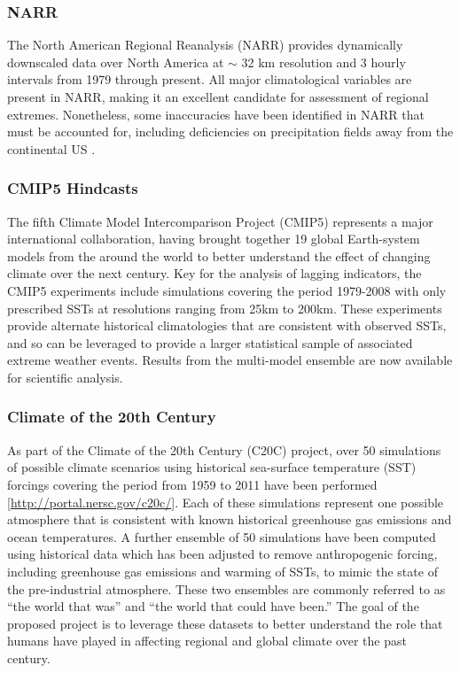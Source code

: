 \documentclass[11pt]{article}
\newcommand\citep{\cite}
\begin{document}
\subsubsection*{NARR} \label{sec:NARR}

The North American Regional Reanalysis (NARR) \citep{mesinger2006north} provides dynamically downscaled data over North America at $\sim$ 32 km resolution and 3 hourly intervals from 1979 through present.  All major climatological variables are present in NARR, making it an excellent candidate for assessment of regional extremes.  Nonetheless, some inaccuracies have been identified in NARR that must be accounted for, including deficiencies on precipitation fields away from the continental US \citep{bukovsky2007brief}.

\subsubsection*{CMIP5 Hindcasts} \label{sec:CMIP5}

The fifth Climate Model Intercomparison Project (CMIP5) represents a major international collaboration, having brought together 19 global Earth-system models from the around the world to better understand the effect of changing climate over the next century.  Key for the analysis of lagging indicators, the CMIP5 experiments include simulations covering the period 1979-2008 with only prescribed SSTs at resolutions ranging from 25km to 200km.  These experiments provide alternate historical climatologies that are consistent with observed SSTs, and so can be leveraged to provide a larger statistical sample of associated extreme weather events.  Results from the multi-model ensemble are now available for scientific analysis.

\subsubsection*{Climate of the 20th Century} \label{sec:EnsembleData}

As part of the Climate of the 20th Century (C20C) project, over 50 simulations of possible climate scenarios using historical sea-surface temperature (SST) forcings covering the period from 1959 to 2011 have been performed [\url{http://portal.nersc.gov/c20c/}].  Each of these simulations represent one possible atmosphere that is consistent with known historical greenhouse gas emissions and ocean temperatures.  A further ensemble of 50 simulations have been computed using historical data which has been adjusted to remove anthropogenic forcing, including greenhouse gas emissions and warming of SSTs, to mimic the state of the pre-industrial atmosphere.  These two ensembles are commonly referred to as ``the world that was'' and ``the world that could have been.''  The goal of the proposed project is to leverage these datasets to better understand the role that humans have played in affecting regional and global climate over the past century.
\end{document}
